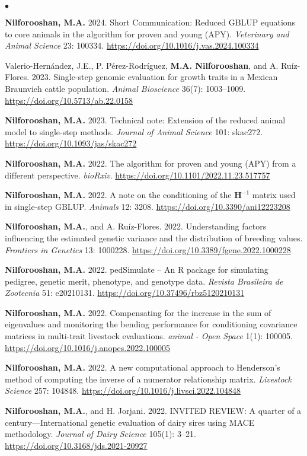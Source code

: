\documentclass[margin,line]{res}
\newenvironment{list2}{
  \begin{list}{$\bullet$}{%
      \setlength{\itemsep}{0in}
      \setlength{\parsep}{0in} \setlength{\parskip}{0in}
      \setlength{\topsep}{0in} \setlength{\partopsep}{0in}
      \setlength{\leftmargin}{0.2in}}}{\end{list}}
\begin{document}
\begin{resume}
  \begin{list2}
    \item {\bf Nilforooshan, M.A.} 2024. Short Communication: Reduced GBLUP equations to core animals in the algorithm for proven and young (APY). {\em Veterinary and Animal Science} 23: 100334. \url{https://doi.org/10.1016/j.vas.2024.100334}
    \item Valerio-Hern\'{a}ndez, J.E., P. P\'{e}rez-Rodr\'{i}guez, {\bf M.A. Nilforooshan}, and A. Ru\'{i}z-Flores. 2023. Single-step genomic evaluation for growth traits in a Mexican Braunvieh cattle population. {\em Animal Bioscience} 36(7): 1003--1009. \url{https://doi.org/10.5713/ab.22.0158}
    \item {\bf Nilforooshan, M.A.} 2023. Technical note: Extension of the reduced animal model to single-step methods. {\em Journal of Animal Science} 101: skac272. \url{https://doi.org/10.1093/jas/skac272}
    \item {\bf Nilforooshan, M.A.} 2022. The algorithm for proven and young (APY) from a different perspective. {\em bioRxiv}. \url{https://doi.org/10.1101/2022.11.23.517757}
    \item {\bf Nilforooshan, M.A.} 2022. A note on the conditioning of the $\mathbf H^{-1}$ matrix used in single-step GBLUP. {\em Animals} 12: 3208. \url{https://doi.org/10.3390/ani12223208}
    \item {\bf Nilforooshan, M.A.}, and A. Ru\'{i}z-Flores. 2022. Understanding factors influencing the estimated genetic variance and the distribution of breeding values. {\em Frontiers in Genetics} 13: 1000228. \url{https://doi.org/10.3389/fgene.2022.1000228}
    \item {\bf Nilforooshan, M.A.} 2022. pedSimulate -- An R package for simulating pedigree, genetic merit, phenotype, and genotype data. {\em Revista Brasileira de Zootecnia} 51: e20210131. \url{https://doi.org/10.37496/rbz5120210131}
    \item {\bf Nilforooshan, M.A.} 2022. Compensating for the increase in the sum of eigenvalues and monitoring the bending performance for conditioning covariance matrices in multi-trait livestock evaluations. {\em animal - Open Space} 1(1): 100005. \url{https://doi.org/10.1016/j.anopes.2022.100005}
    \item {\bf Nilforooshan, M.A.} 2022. A new computational approach to Henderson's method of computing the inverse of a numerator relationship matrix. {\em Livestock Science} 257: 104848. \url{https://doi.org/10.1016/j.livsci.2022.104848}
    \item {\bf Nilforooshan, M.A.}, and H. Jorjani. 2022. INVITED REVIEW: A quarter of a century---International genetic evaluation of dairy sires using MACE methodology. {\em Journal of Dairy Science} 105(1): 3--21. \url{https://doi.org/10.3168/jds.2021-20927}

\end{list2}
\end{resume}
\end{document}
